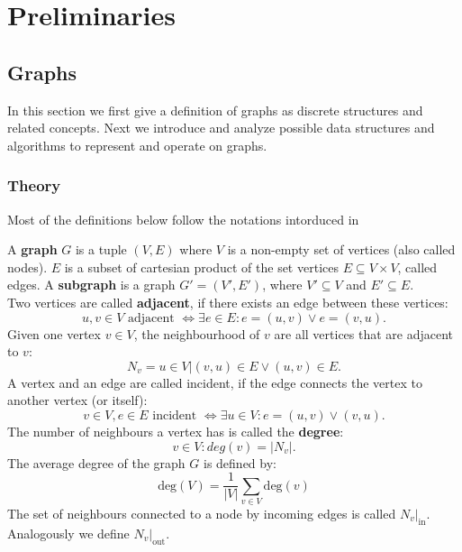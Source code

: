 \chapter{Preliminaries}\label{\positionnumber}

\section{Graphs
}\label{\positionnumber}
In this section we first give a definition of graphs as discrete structures and related concepts. Next we introduce and analyze possible data structures and algorithms to represent and operate on graphs. \\
        \subsection{Theory}\label{\positionnumber}
            Most of the definitions below follow the notations intorduced in ~\autocite{steger2007diskrete, Gross1998GraphTA, aho1974design, cormen2009introduction, Goodrich2014AlgorithmDA}
        
            A \textbf{graph} $G$ is a tuple $(V, E)$ where $V$ is a non-empty set of vertices (also called nodes). 
            $E$ is a subset of cartesian product of the set vertices $E \subseteq V \times V$, called edges.
            A \textbf{subgraph} is a graph $G' = (V', E')$, where $V' \subseteq V$ and $E' \subseteq E$. \\
            
            Two vertices are called \textbf{adjacent}, if there exists an edge between these vertices: 
            \[ u,v \in V \text{ adjacent } \Leftrightarrow \exists e \in E: e = (u, v) \vee e= (v, u).\]
            Given one vertex $v \in V$, the neighbourhood of $v$ are all vertices that are adjacent to $v$: 
            \[N_v = {u \in V | (v, u) \in E \vee (u, v) \in E}.\] 
            A vertex and an edge are called incident, if the edge connects the vertex to another vertex (or itself): 
            \[v \in V, e\in E \text{ incident } \Leftrightarrow \exists u \in V: e = (u,v) \vee (v,u).\]
            The number of neighbours a vertex has is called the \textbf{degree}: 
            \[v \in V: deg(v) = |N_v|.\]
            The average degree of the graph $G$ is defined by:
            \[ \text{deg}(V) = \frac{1}{|V|} \sum_{v \in V}\text{deg}(v)\]
            The set of neighbours connected to a node by incoming edges is called $N_v |_\text{in}$. Analogously we define $N_v |_\text{out}$. \\
            
